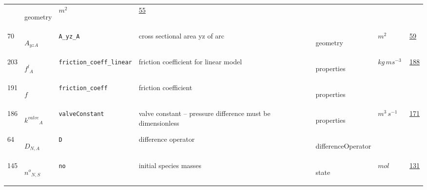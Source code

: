 \begin{longtable}{|p{1cm}|p{2.5cm}|p{4.5cm}|p{8cm}|p{3.0cm}|p{3cm}|p{1cm}|}
             & \begin{lay}geometry \end{lay}
             & $ m^{2} \, $
             &                 \hyperlink{"e:55"}{ 55 }
                 \\
            70
             & \hypertarget{"v:70"}{ $ {{A_{yz}}}{_{A}} $}
             & \verb|A_yz_A|
             & cross sectional area yz of arc
             & \begin{lay}geometry \end{lay}
             & $ m^{2} \, $
             &                 \hyperlink{"e:59"}{ 59 }
                 \\
            203
             & \hypertarget{"v:203"}{ $ {{f^l}}{_{A}} $}
             & \verb|friction_coeff_linear|
             & friction coefficient for linear model
             & \begin{lay}properties \end{lay}
             & $ kg \,m s^{-3} \, $
             &                 \hyperlink{"e:188"}{ 188 }
                 \\
            191
             & \hypertarget{"v:191"}{ $ {{f}}{_{}} $}
             & \verb|friction_coeff|
             & friction coefficient
             & \begin{lay}properties \end{lay}
             & $  $
             & \\
            186
             & \hypertarget{"v:186"}{ $ {{k^{valve}}}{_{A}} $}
             & \verb|valveConstant|
             & valve constant -- pressure difference must be dimensionless
             & \begin{lay}properties \end{lay}
             & $ m^{3} \,s^{-1} \, $
             &                 \hyperlink{"e:171"}{ 171 }
                 \\
            64
             & \hypertarget{"v:64"}{ $ {D}{_{N, A}} $}
             & \verb|D|
             & difference operator
             & \begin{lay}differenceOperator \end{lay}
             & $  $
             & \\
            145
             & \hypertarget{"v:145"}{ $ {{n^o}}{_{N, S}} $}
             & \verb|no|
             & initial species masses
             & \begin{lay}state \end{lay}
             & $ mol \, $
             &                 \hyperlink{"e:131"}{ 131 }

\end{longtable}
